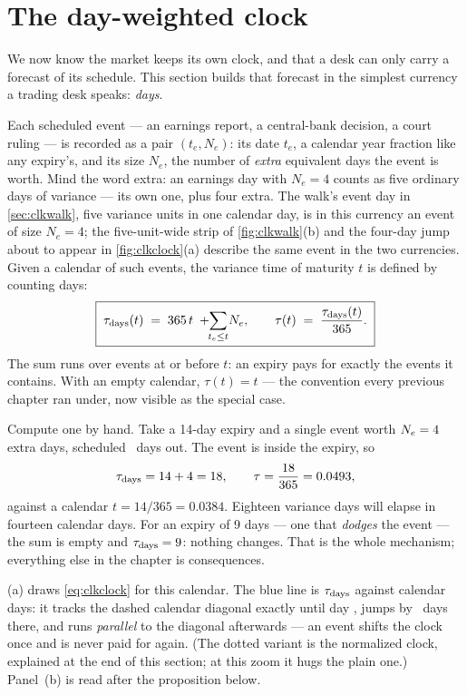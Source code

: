 \section{The day-weighted clock}
\label{sec:clkclock}

We now know the market keeps its own clock, and that a desk can only
carry a forecast of its schedule.  This section builds that forecast
in the simplest currency a trading desk speaks: \emph{days}.

Each scheduled event --- an earnings report, a central-bank decision,
a court ruling --- is recorded as a pair $(t_e, N_e)$: its date
$t_e$, a calendar year fraction like any expiry's, and its size
$N_e$, the number of \emph{extra} equivalent days the event is worth.
Mind the word extra: an earnings day with $N_e=4$ counts as five
ordinary days of variance --- its own one, plus four extra.  The
walk's event day in \cref{sec:clkwalk}, five variance units in one
calendar day, is in this currency an event of size $N_e=4$; the
five-unit-wide strip of \cref{fig:clkwalk}(b) and the four-day jump
about to appear in \cref{fig:clkclock}(a) describe the same event in
the two currencies.  Given a calendar of such events, the variance
time of maturity $t$ is defined by counting days:
\begin{equation}
\boxed{\;\tau_{\rm days}(t)\;=\;365\,t
\;+\!\!\sum_{t_e\le t}\!N_e,
\qquad
\tau(t)\;=\;\frac{\tau_{\rm days}(t)}{365}.\;}
\label{eq:clkclock}
\end{equation}
The sum runs over events at or before $t$: an expiry pays for exactly
the events it contains.  With an empty calendar, $\tau(t)=t$ --- the
convention every previous chapter ran under, now visible as the
special case.

Compute one by hand.  Take a 14-day expiry and a single event worth
$N_e=4$ extra days, scheduled
\MacClkClockEventDay\ days out.  The event is inside the expiry, so
\[
\tau_{\rm days}=14+4=18,
\qquad
\tau=\frac{18}{365}=0.0493,
\]
against a calendar $t=14/365=0.0384$.  Eighteen variance days will
elapse in fourteen calendar days.  For an expiry of 9 days --- one
that \emph{dodges} the event --- the sum is empty and
$\tau_{\rm days}=9$: nothing changes.  That is the whole mechanism;
everything else in the chapter is consequences.

(a) draws \eqref{eq:clkclock} for this calendar.
The blue line is $\tau_{\rm days}$ against calendar days: it tracks
the dashed calendar diagonal exactly until day \MacClkClockEventDay,
jumps by \MacClkClockExtraDays\ days there, and runs \emph{parallel}
to the diagonal afterwards --- an event shifts the clock once and is
never paid for again.  (The dotted variant is the normalized clock,
explained at the end of this section; at this zoom it hugs the plain
one.)  Panel~(b) is read after the proposition below.


